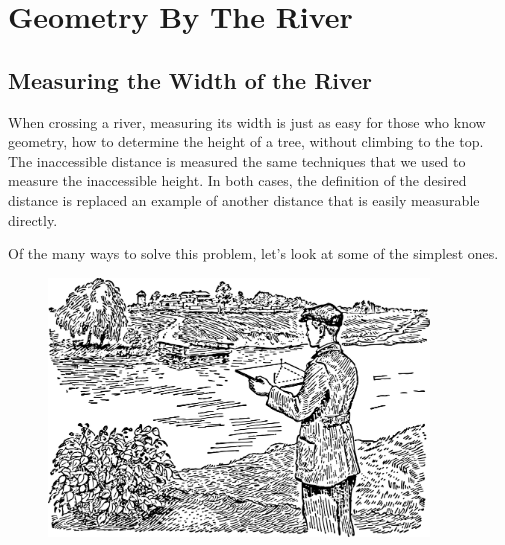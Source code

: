 

\chapter{Geometry By The River}
\label{ch-02}

\section{Measuring the Width of the River}
\label{sec-2.1}
When crossing a river, measuring its width is just as easy for those who know geometry, how to determine the height of a tree, without climbing to the top. The inaccessible distance is measured the same techniques that we used to measure the inaccessible height. In both cases, the definition of the desired distance is replaced an example of another distance that is easily measurable directly.

Of the many ways to solve this problem, let's look at some of the simplest ones.

\begin{figure}[h!]
\centering
\includegraphics[width=0.9\textwidth]{figures/ch-02/fig-025.pdf}
\end{figure}

